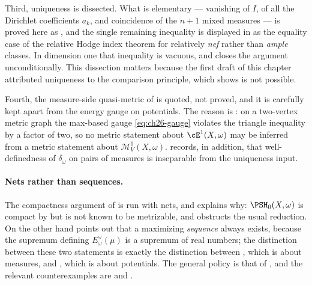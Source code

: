 Third, uniqueness is dissected.  What is elementary --- vanishing of $I$, of
all the Dirichlet coefficients $a_k$, and coincidence of the $n+1$ mixed
measures --- is proved here as , and the single
remaining inequality is displayed in  as the
equality case of the relative Hodge index theorem for relatively \emph{nef}
rather than \emph{ample} classes.  In dimension one that inequality is
vacuous, and  closes the argument
unconditionally.  This dissection matters because the first draft of this
chapter attributed uniqueness to the comparison principle, which
 shows is not possible.

Fourth, the measure-side quasi-metric of
 is quoted, not proved, and it is
carefully kept apart from the energy gauge on potentials.  The reason is
: on a two-vertex metric graph the max-based
gauge \eqref{eq:ch26-gauge} violates the triangle inequality by a factor of
two, so no metric statement about $\cE^1(X,\omega)$ may be inferred from a
metric statement about $\mathcal M^1_V(X,\omega)$.
 records, in addition, that
well-definedness of $\delta_\omega$ on pairs of measures is inseparable
from the uniqueness input.

\paragraph{Nets rather than sequences.}
The compactness argument of  is run with
nets, and  explains why: $\PSH_0(X,\omega)$ is
compact by  but is not known to be metrizable,
and  obstructs the usual reduction.  On
the other hand  points out that a
maximizing \emph{sequence} always exists, because the supremum defining
$E^\vee_\omega(\mu)$ is a supremum of real numbers; the distinction between
these two statements is exactly the distinction between
, which is about measures, and
, which is about potentials.  The general
policy is that of , and the relevant
counterexamples are  and
.

